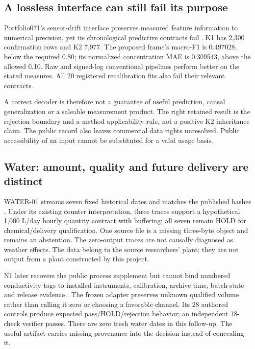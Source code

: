 \documentclass[11pt,letterpaper]{article}
\begin{document}
\subsection{A lossless interface can still fail its purpose}
Portfolio071's sensor-drift interface preserves measured feature information to numerical precision, yet its chronological predictive contracts fail \cite{portfolio151}. K1 has 2,300 confirmation rows and K2 7,977. The proposed frame's macro-F1 is 0.497028, below the required 0.80; its normalized concentration MAE is 0.309543, above the allowed 0.10. Raw and signed-log conventional pipelines perform better on the stated measures. All 20 registered recalibration fits also fail their relevant contracts.

A correct decoder is therefore not a guarantee of useful prediction, causal generalization or a saleable measurement product. The right retained result is the rejection boundary and a method applicability rule, not a positive K2 inheritance claim. The public record also leaves commercial data rights unresolved. Public accessibility of an input cannot be substituted for a valid usage basis.

\subsection{Water: amount, quality and future delivery are distinct}
WATER-01 streams seven fixed historical dates and matches the published hashes \cite{water}. Under its existing counter interpretation, three traces support a hypothetical 1,000 L/day hourly quantity contract with buffering; all seven remain HOLD for chemical/delivery qualification. One source file is a missing three-byte object and remains an abstention. The zero-output traces are not causally diagnosed as weather effects. The data belong to the source researchers' plant; they are not output from a plant constructed by this project.

N1 later recovers the public process supplement but cannot bind numbered conductivity tags to installed instruments, calibration, archive time, batch state and release evidence \cite{nextseries}. The frozen adapter preserves unknown qualified volume rather than calling it zero or choosing a favorable channel. Its 28 authored controls produce expected pass/HOLD/rejection behavior; an independent 18-check verifier passes. There are zero fresh water dates in this follow-up. The useful artifact carries missing provenance into the decision instead of concealing it.
\end{document}
